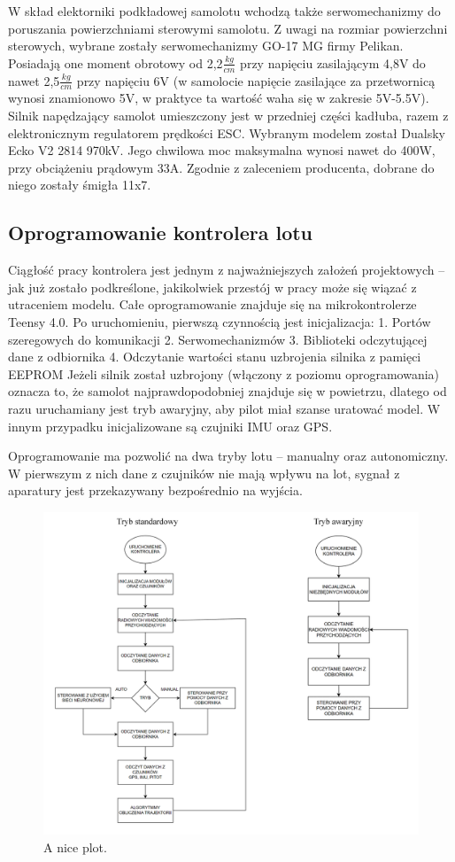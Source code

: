 \documentclass[12pt, a4paper]{article}
\begin{document}
W skład elektorniki podkładowej samolotu wchodzą także serwomechanizmy do poruszania powierzchniami sterowymi samolotu. Z uwagi na rozmiar powierzchni sterowych, wybrane zostały serwomechanizmy GO-17 MG firmy Pelikan. Posiadają one moment obrotowy od 2,2$\frac{kg}{cm}$ przy napięciu zasilającym 4,8V do nawet 2,5$\frac{kg}{cm}$ przy napięciu 6V (w samolocie napięcie zasilające za przetwornicą wynosi znamionowo 5V, w praktyce ta wartość waha się w zakresie 5V-5.5V). Silnik napędzający samolot umieszczony jest w przedniej części kadłuba, razem z elektronicznym regulatorem prędkości ESC. Wybranym modelem został Dualsky Ecko V2 2814 970kV. Jego chwilowa moc maksymalna wynosi nawet do 400W, przy obciążeniu prądowym 33A. Zgodnie z zaleceniem producenta, dobrane do niego zostały śmigła  11x7. 

 \clearpage
\subsection{Oprogramowanie kontrolera lotu}
Ciągłość pracy kontrolera jest jednym z najważniejszych założeń projektowych – jak już zostało podkreślone, jakikolwiek przestój w pracy może się wiązać z utraceniem modelu. Całe oprogramowanie znajduje się na mikrokontrolerze Teensy 4.0. Po uruchomieniu, pierwszą czynnością jest inicjalizacja:
1.	Portów szeregowych do komunikacji
2.	Serwomechanizmów 
3.	Biblioteki odczytującej dane z odbiornika
4.	Odczytanie wartości stanu uzbrojenia silnika z pamięci EEPROM
Jeżeli silnik został uzbrojony (włączony z poziomu oprogramowania) oznacza to, że samolot najprawdopodobniej znajduje się w powietrzu, dlatego od razu uruchamiany jest tryb awaryjny, aby pilot miał szanse uratować model. W innym przypadku inicjalizowane są czujniki IMU oraz GPS.

Oprogramowanie ma pozwolić na dwa tryby lotu – manualny oraz autonomiczny. W pierwszym z nich dane z czujników nie mają wpływu na lot, sygnał z aparatury jest przekazywany bezpośrednio na wyjścia.
 
    \begin{figure}[ht]
    \centering
    \includegraphics[width=1\textwidth]{diagramy}
    \caption{A nice plot.}
\end{figure}
\end{document}
